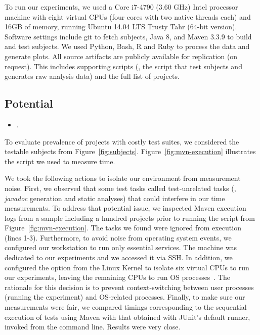 To run our experiments, we used a Core i7-4790 (3.60 GHz) Intel
processor machine with eight virtual CPUs (four cores with two native
threads each) and 16GB of memory, running Ubuntu 14.04 LTS Trusty Tahr
(64-bit version).  Software settings include git to fetch
subjects, Java 8, and Maven 3.3.9 to build and test subjects. We used
Python, Bash, R and Ruby to process the
data and generate plots.  All source artifacts are publicly available
for replication (on request).  This
includes supporting scripts (\eg, the script that test subjects and
generates raw analysis data) and the full list of projects. 

\subsection{Potential}
\label{sec:rqA}
\label{sec:rqB}

\begin{itemize}
    \item \numRQA{}. \textbf{\RQA}
\end{itemize}

To evaluate prevalence of projects with costly test suites, we
considered the \numSubjs{} testable subjects from
Figure~\ref{fig:subjects}.  Figure~\ref{fig:mvn-execution} illustrates
the script we used to measure time.

We took the following actions to isolate our environment from
measurement noise.  First, we observed that some test tasks called
test-unrelated tasks (\eg, \emph{javadoc} generation and static
analyses) that could interfere in our time measurements.  To address
that potential issue, we inspected Maven execution logs from a sample
including a hundred projects prior to running the script from
Figure~\ref{fig:mvn-execution}.  The tasks we found were ignored from
execution (lines 1-3).  Furthermore, to avoid noise from operating
system events, we configured our workstation to run only essential
services.  The machine was dedicated to our experiments and we
accessed it via SSH. In addition, we configured the 
option from the Linux Kernel \cite{linux-kernel} to isolate six
virtual CPUs to run our experiments, leaving the remaining CPUs to run
OS processes~\cite{isolcpus-use}.  The rationale for this decision is
to prevent context-switching between user processes (running the
experiment) and OS-related processes.  Finally, to make sure our
measurements were fair, we compared timings corresponding to the
sequential execution of tests using Maven with that obtained with
JUnit's default  runner, invoked from the command
line.  Results were very close.

